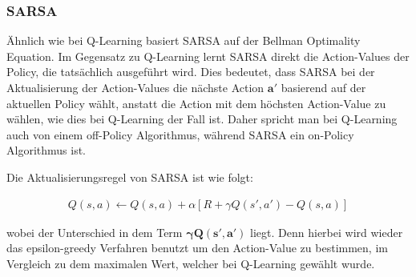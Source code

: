\subsubsection{SARSA}

Ähnlich wie bei Q-Learning basiert SARSA auf der Bellman Optimality Equation. Im Gegensatz zu Q-Learning lernt SARSA direkt die Action-Values der Policy, die tatsächlich ausgeführt wird. Dies bedeutet, dass SARSA bei der Aktualisierung der Action-Values die nächste Action $\bm{a'}$ basierend auf der aktuellen Policy wählt, anstatt die Action mit dem höchsten Action-Value zu wählen, wie dies bei Q-Learning der Fall ist.
Daher spricht man bei Q-Learning auch von einem off-Policy Algorithmus, während SARSA ein on-Policy Algorithmus ist. 

Die Aktualisierungsregel von SARSA ist wie folgt:

\begin{align}
    Q(s,a) \leftarrow Q(s,a) + \alpha [R + \gamma Q(s',a') - Q(s,a)]
\end{align}

wobei der Unterschied in dem Term $\bm{\gamma Q(s',a')}$ liegt. Denn hierbei wird wieder das epsilon-greedy Verfahren benutzt um den Action-Value zu bestimmen, im Vergleich zu dem maximalen Wert, welcher bei Q-Learning gewählt wurde.

